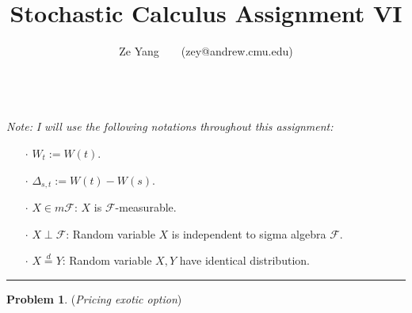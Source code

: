 \documentclass[a4paper, 10pt]{article}
\title{\textbf{Stochastic Calculus Assignment VI}}
\author{Ze Yang~~~~(zey@andrew.cmu.edu)}
\theoremstyle{definition}
\newtheorem{problem}{Problem}
\theoremstyle{hSol}
\begin{document}
\maketitle

~\\
\textit{Note:} \textit{I will use the following notations throughout this assignment:}
\begin{itemize}
	\item[$\cdot$] $W_t := W(t)$.
	\item[$\cdot$] $\Delta_{s,t} := W(t) - W(s)$.
	\item[$\cdot$] $X\in m \mathcal{F}$: $X$ is $\mathcal{F}$-measurable.
	\item[$\cdot$] $X\perp \mathcal{F}$: Random variable $X$ is independent to sigma algebra $\mathcal{F}$. 
	\item[$\cdot$] $X\stackrel{d}{=} Y$: Random variable $X,Y$ have identical distribution.
\end{itemize}
\noindent\rule{16cm}{0.4pt}
\begin{problem} (\textit{Pricing exotic option})
\end{problem}
\end{document}

